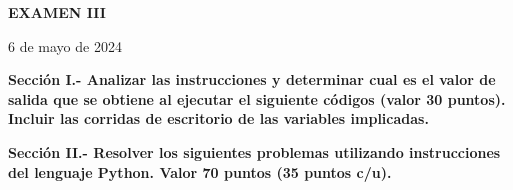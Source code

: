 \documentclass[10pt,addpoints]{exam}
\begin{document}
\begin{center}
  \sffamily\textbf{EXAMEN III}
\end{center}
\begin{flushright}
6 de mayo de 2024
\end{flushright}

\begin{questions}
\begin{EnvFullwidth}
  \sffamily\textbf{Sección I.- Analizar las instrucciones y determinar
  cual es el valor de salida que se obtiene al ejecutar el
  siguiente códigos (valor 30 puntos). Incluir las corridas de
  escritorio de las variables implicadas.
  }
\end{EnvFullwidth}



\end{questions}

\begin{questions}
\begin{EnvFullwidth}
  \sffamily\textbf{Sección II.- Resolver los siguientes problemas utilizando
  instrucciones del lenguaje Python. Valor 70 puntos (35 puntos c/u).}
\end{EnvFullwidth}




\end{questions}
\end{document}
